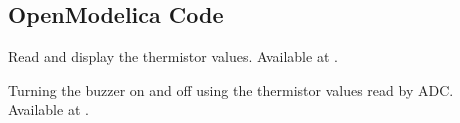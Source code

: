 \subsection{OpenModelica Code}
\label{sec:therm-OpenModelica-code}

\begin{OpenModelicacode}
 {Read and display
    the thermistor values.  Available at
  .}
\label{OpenModelica:therm-read}

\end{OpenModelicacode}

\begin{OpenModelicacode}
  {Turning the buzzer on and off using the thermistor values read by
    ADC.  Available at .}
\label{OpenModelica:therm-buzzer}

\end{OpenModelicacode}
